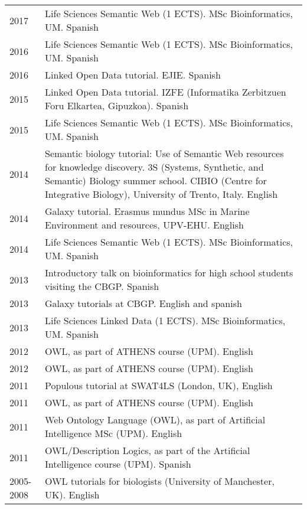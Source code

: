 \documentclass[11pt,fullpage]{article}
\begin{document}
\begin{longtable}{p{0.5in}|p{5.5in}}
2017 & Life Sciences Semantic Web (1 ECTS). MSc Bioinformatics, UM. Spanish \\
2016 & Life Sciences Semantic Web (1 ECTS). MSc Bioinformatics, UM. Spanish \\
2016 & Linked Open Data tutorial. EJIE. Spanish \\
2015 & Linked Open Data tutorial. IZFE (Informatika Zerbitzuen Foru Elkartea, Gipuzkoa). Spanish \\
2015 & Life Sciences Semantic Web (1 ECTS). MSc Bioinformatics, UM. Spanish \\
2014 & Semantic biology tutorial: Use of Semantic Web resources for knowledge discovery. 3S (Systems, Synthetic, and Semantic) Biology summer school. CIBIO (Centre for Integrative Biology), University of Trento, Italy. English \\
2014 & Galaxy tutorial. Erasmus mundus MSc in Marine Environment and resources, UPV-EHU. English \\
2014 & Life Sciences Semantic Web (1 ECTS). MSc Bioinformatics, UM. Spanish \\ %
2013 & Introductory talk on bioinformatics for high school students visiting the CBGP. Spanish \\
2013 & Galaxy tutorials at CBGP. English and spanish \\ %
2013 & Life Sciences Linked Data (1 ECTS). MSc Bioinformatics, UM. Spanish \\
2012 & OWL, as part of ATHENS course (UPM). English \\
2012 & OWL, as part of ATHENS course (UPM). English \\
2011 & Populous tutorial at SWAT4LS (London, UK), English \\
2011 & OWL, as part of ATHENS course (UPM). English \\
2011 & Web Ontology Language (OWL), as part of Artificial Intelligence MSc (UPM). English \\ %
2011 & OWL/Description Logics, as part of the Artificial Intelligence course (UPM). Spanish \\ %
2005-2008 & OWL tutorials for biologists (University of Manchester, UK). English \\

\end{longtable}
\end{document}
